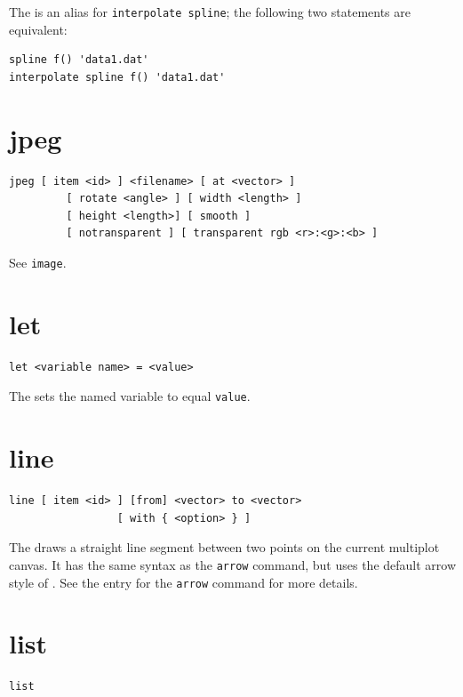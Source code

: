 The  is an alias for {\tt interpolate spline}; the following
two statements are equivalent:

\begin{verbatim}
spline f() 'data1.dat'
interpolate spline f() 'data1.dat'
\end{verbatim}


\section{jpeg}

\begin{verbatim}
jpeg [ item <id> ] <filename> [ at <vector> ]
         [ rotate <angle> ] [ width <length> ]
         [ height <length>] [ smooth ]
         [ notransparent ] [ transparent rgb <r>:<g>:<b> ]
\end{verbatim}

See {\tt image}.


\section{let}

\begin{verbatim}
let <variable name> = <value>
\end{verbatim}

The  sets the named variable to equal {\tt value}.


\section{line}

\begin{verbatim}
line [ item <id> ] [from] <vector> to <vector>
                 [ with { <option> } ]
\end{verbatim}

The  draws a straight line segment between two points on the
current multiplot canvas. It has the same syntax as the {\tt arrow} command,
but uses the default arrow style of . See the entry for the
{\tt arrow} command for more details.


\section{list}

\begin{verbatim}
list
\end{verbatim}

